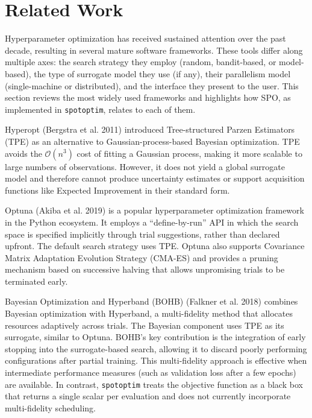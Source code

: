 \documentclass[
  twocolumn]{article}
\begin{document}
\section{Related Work}\label{sec-related}

Hyperparameter optimization has received sustained attention over the
past decade, resulting in several mature software frameworks. These
tools differ along multiple axes: the search strategy they employ
(random, bandit-based, or model-based), the type of surrogate model they
use (if any), their parallelism model (single-machine or distributed),
and the interface they present to the user. This section reviews the
most widely used frameworks and highlights how SPO, as implemented in
\texttt{spotoptim}, relates to each of them.

Hyperopt (Bergstra et al. 2011) introduced Tree-structured Parzen
Estimators (TPE) as an alternative to Gaussian-process-based Bayesian
optimization. TPE avoids the \(\mathcal{O}(n^3)\) cost of fitting a
Gaussian process, making it more scalable to large numbers of
observations. However, it does not yield a global surrogate model and
therefore cannot produce uncertainty estimates or support acquisition
functions like Expected Improvement in their standard form.

Optuna (Akiba et al. 2019) is a popular hyperparameter optimization
framework in the Python ecosystem. It employs a ``define-by-run'' API in
which the search space is specified implicitly through trial
suggestions, rather than declared upfront. The default search strategy
uses TPE. Optuna also supports Covariance Matrix Adaptation Evolution
Strategy (CMA-ES) and provides a pruning mechanism based on successive
halving that allows unpromising trials to be terminated early.

Bayesian Optimization and Hyperband (BOHB) (Falkner et al. 2018)
combines Bayesian optimization with Hyperband, a multi-fidelity method
that allocates resources adaptively across trials. The Bayesian
component uses TPE as its surrogate, similar to Optuna. BOHB's key
contribution is the integration of early stopping into the
surrogate-based search, allowing it to discard poorly performing
configurations after partial training. This multi-fidelity approach is
effective when intermediate performance measures (such as validation
loss after a few epochs) are available. In contrast, \texttt{spotoptim}
treats the objective function as a black box that returns a single
scalar per evaluation and does not currently incorporate multi-fidelity
scheduling.
\end{document}
